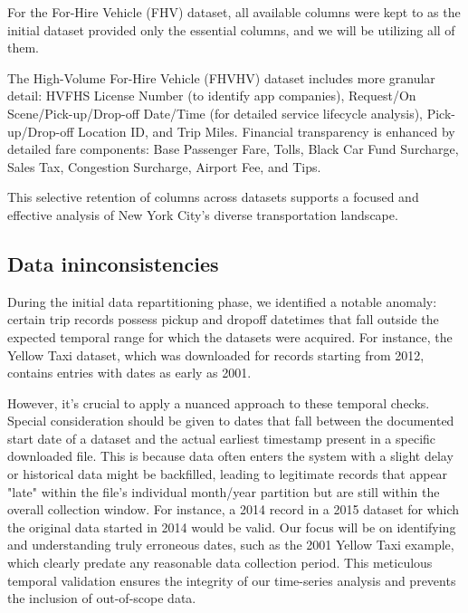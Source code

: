 \documentclass[conference]{IEEEtran}
\begin{document}
For the For-Hire Vehicle (FHV) dataset, all available columns were kept to as the initial dataset provided only the
essential columns, and we will be utilizing all of them.

The High-Volume For-Hire Vehicle (FHVHV) dataset includes more granular detail: HVFHS License Number (to identify app
companies), Request/On Scene/Pick-up/Drop-off Date/Time (for detailed service lifecycle analysis), Pick-up/Drop-off
Location ID, and Trip Miles. Financial transparency is enhanced by detailed fare components: Base Passenger Fare, Tolls,
Black Car Fund Surcharge, Sales Tax, Congestion Surcharge, Airport Fee, and Tips.

This selective retention of columns across datasets supports a focused and effective analysis of New York City's diverse
transportation landscape.

\subsection{Data ininconsistencies}
During the initial data repartitioning phase, we identified a notable anomaly: certain trip records possess pickup and
dropoff datetimes that fall outside the expected temporal range for which the datasets were acquired.
For instance, the Yellow Taxi dataset, which was downloaded for records starting from 2012, contains entries
with dates as early as 2001.

However, it's crucial to apply a nuanced approach to these temporal checks. Special consideration should be given to
dates that fall between the documented start date of a dataset and the actual earliest timestamp present in a specific
downloaded file. This is because data often enters the system with a slight delay or historical data might be backfilled,
leading to legitimate records that appear "late" within the file's individual month/year partition but are still within
the overall collection window. For instance, a 2014 record in a 2015 dataset for which the original data started in 2014
would be valid. Our focus will be on identifying and understanding truly erroneous dates, such as the 2001 Yellow Taxi
example, which clearly predate any reasonable data collection period. This meticulous temporal validation ensures the
integrity of our time-series analysis and prevents the inclusion of out-of-scope data.

\end{document}
